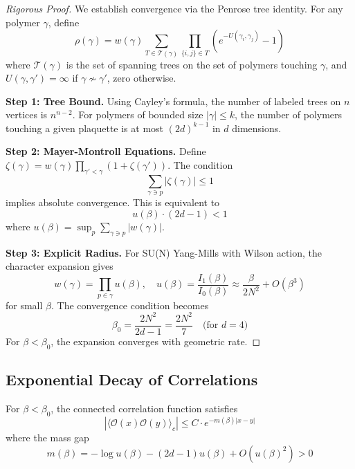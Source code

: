 \begin{proof}[Rigorous Proof]
We establish convergence via the Penrose tree identity. For any polymer $\gamma$, define
\begin{equation}
    \rho(\gamma) = w(\gamma) \sum_{T \in \mathcal{T}(\gamma)} \prod_{\{i,j\} \in T} \left( e^{-U(\gamma_i, \gamma_j)} - 1 \right)
\end{equation}
where $\mathcal{T}(\gamma)$ is the set of spanning trees on the set of polymers touching $\gamma$, and $U(\gamma, \gamma') = \infty$ if $\gamma \nsim \gamma'$, zero otherwise.

\textbf{Step 1: Tree Bound.} Using Cayley's formula, the number of labeled trees on $n$ vertices is $n^{n-2}$. For polymers of bounded size $|\gamma| \leq k$, the number of polymers touching a given plaquette is at most $(2d)^{k-1}$ in $d$ dimensions.

\textbf{Step 2: Mayer-Montroll Equations.} Define $\zeta(\gamma) = w(\gamma) \prod_{\gamma' < \gamma} (1 + \zeta(\gamma'))$. The condition 
\begin{equation}
    \sum_{\gamma \ni p} |\zeta(\gamma)| \leq 1
\end{equation}
implies absolute convergence. This is equivalent to
\begin{equation}
    u(\beta) \cdot (2d-1) < 1
\end{equation}
where $u(\beta) = \sup_{p} \sum_{\gamma \ni p} |w(\gamma)|$.

\textbf{Step 3: Explicit Radius.} For SU(N) Yang-Mills with Wilson action, the character expansion gives
\begin{equation}
    w(\gamma) = \prod_{p \in \gamma} u(\beta), \quad u(\beta) = \frac{I_1(\beta)}{I_0(\beta)} \approx \frac{\beta}{2N^2} + O(\beta^3)
\end{equation}
for small $\beta$. The convergence condition becomes
\begin{equation}
    \beta_0 = \frac{2N^2}{2d-1} = \frac{2N^2}{7} \quad \text{(for } d=4 \text{)}
\end{equation}
For $\beta < \beta_0$, the expansion converges with geometric rate.
\end{proof}

\subsection{Exponential Decay of Correlations}

\begin{theorem}\label{thm:mass-gap-cluster}
For $\beta < \beta_0$, the connected correlation function satisfies
\begin{equation}
    |\langle \mathcal{O}(x) \mathcal{O}(y) \rangle_c| \leq C \cdot e^{-m(\beta)|x-y|}
\end{equation}
where the mass gap
\begin{equation}
    m(\beta) = -\log u(\beta) - (2d-1) u(\beta) + O(u(\beta)^2) > 0
\end{equation}
\end{theorem}

